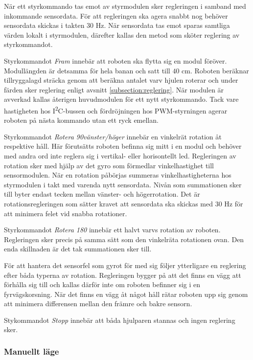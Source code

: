 \documentclass[11pt]{article}
\begin{document}
\begin{flushleft}
När ett styrkommando tas emot av styrmodulen sker regleringen i samband med inkommande sensordata. För att regleringen ska agera snabbt nog behöver sensordata skickas i takten $30$ Hz. När sensordata tas emot sparas samtliga värden lokalt i styrmodulen, därefter kallas den metod som sköter reglering av styrkommandot. 

Styrkommandot \textit{Fram} innebär att roboten ska flytta sig en modul föröver. Modullängden är detsamma för hela banan och satt till $40$ cm. Roboten beräknar tillryggalagd sträcka genom att beräkna antalet varv hjulen roterar och under färden sker reglering enligt avsnitt \ref{subsection:reglering}. När modulen är avverkad kallas återigen huvudmodulen för ett nytt styrkommando. Tack vare hastigheten hos I\textsuperscript{2}C-bussen och fördröjningen hos PWM-styrningen agerar roboten på nästa kommando utan ett ryck emellan. 

Styrkommandot \textit{Rotera 90\textdegree vänster/höger} innebär en vinkelrät rotation åt respektive håll. Här förutsätts roboten befinna sig mitt i en modul och behöver med andra ord inte reglera sig i vertikal- eller horisontellt led. Regleringen av rotation sker med hjälp av det gyro som förmedlar vinkelhastighet till sensormodulen. När en rotation påbörjas summeras vinkelhastigheterna hos styrmodulen i takt med varenda nytt sensordata. Nivån som summationen sker till byter endast tecken mellan vänster- och högerrotation. Det är rotationsregleringen som sätter kravet att sensordata ska skickas med $30$ Hz för att minimera felet vid snabba rotationer. 

Styrkommandot \textit{Rotera 180\textdegree} innebär ett halvt varvs rotation av roboten. Regleringen sker precis på samma sätt som den vinkelräta rotationen ovan. Den enda skillnaden är det tak summationen sker till. 


För att hantera det sensorfel som gyrot för med sig följer ytterligare en reglering efter båda typerna av rotation. Regleringen bygger på att det finns en vägg att förhålla sig till och kallas därför inte om roboten befinner sig i en fyrvägskorsning. När det finns en vägg åt något håll rätar roboten upp sig genom att minimera differensen mellan den främre och bakre sensorn. 

Stykommandot \textit{Stopp} innebär att båda hjulparen stannas och ingen reglering sker. 

\subsubsection*{Manuellt läge}




\end{flushleft}
\end{document}
